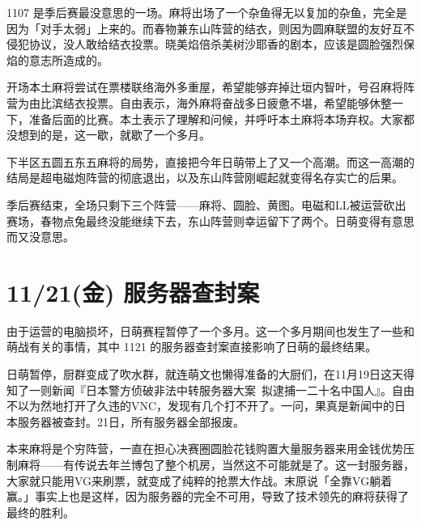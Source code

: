 
1107 是季后赛最没意思的一场。麻将出场了一个杂鱼得无以复加的杂鱼，完全是因为「对手太弱」上来的。而春物兼东山阵营的结衣，则因为圆麻联盟的友好互不侵犯协议，没人敢给结衣投票。晓美焰倍杀美树沙耶香的剧本，应该是圆脸强烈保焰的意志所造成的。

开场本土麻将尝试在票楼联络海外多重屋，希望能够弃掉辻垣内智叶，号召麻将阵营为由比滨结衣投票。自由表示，海外麻将奋战多日疲惫不堪，希望能够休整一下，准备后面的比赛。本土表示了理解和问候，并呼吁本土麻将本场弃权。大家都没想到的是，这一歇，就歇了一个多月。

下半区五圆五东五麻将的局势，直接把今年日萌带上了又一个高潮。而这一高潮的结局是超电磁炮阵营的彻底退出，以及东山阵营刚崛起就变得名存实亡的后果。

季后赛结束，全场只剩下三个阵营——麻将、圆脸、黄图。电磁和LL被运营砍出赛场，春物点兔最终没能继续下去，东山阵营则幸运留下了两个。日萌变得有意思而又没意思。

\section{11/21(金) 服务器查封案}

由于运营的电脑损坏，日萌赛程暂停了一个多月。这一个多月期间也发生了一些和萌战有关的事情，其中 1121 的服务器查封案直接影响了日萌的最终结果。

日萌暂停，厨群变成了吹水群，就连萌文也懒得准备的大厨们，在11月19日这天得知了一则新闻『日本警方侦破非法中转服务器大案~拟逮捕一二十名中国人』。自由不以为然地打开了久违的VNC，发现有几个打不开了。一问，果真是新闻中的日本服务器被查封。21日，所有服务器全部报废。

本来麻将是个穷阵营，一直在担心决赛圈圆脸花钱购置大量服务器来用金钱优势压制麻将——有传说去年兰博包了整个机房，当然这不可能就是了。这一封服务器，大家就只能用VG来刷票，就变成了纯粹的抢票大作战。末原说「全靠VG躺着赢。」事实上也是这样，因为服务器的完全不可用，导致了技术领先的麻将获得了最终的胜利。

